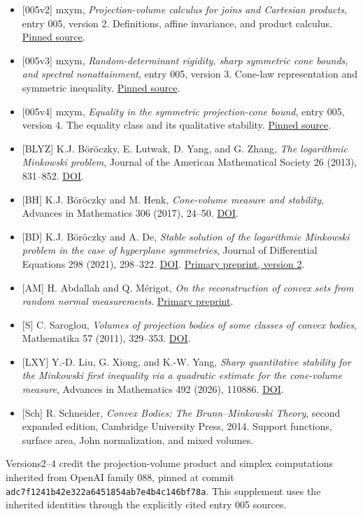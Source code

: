 \documentclass[
  11pt,
]{article}
\providecommand{\tightlist}{%
  \setlength{\itemsep}{0pt}\setlength{\parskip}{0pt}}
\begin{document}
\begin{itemize}
\tightlist
\item
  {[}005v2{]} mxym, \emph{Projection-volume calculus for joins and
  Cartesian products}, entry 005, version 2. Definitions, affine
  invariance, and product calculus.
  \href{https://github.com/mxym/math/blob/6785c1c830f8e19e2eb07b0bb89f4d475a8b154a/preprints/005-simplex-product-optimum/v2/paper.md}{Pinned
  source}.
\item
  {[}005v3{]} mxym, \emph{Random-determinant rigidity, sharp symmetric
  cone bounds, and spectral nonattainment}, entry 005, version 3.
  Cone-law representation and symmetric inequality.
  \href{https://github.com/mxym/math/blob/6785c1c830f8e19e2eb07b0bb89f4d475a8b154a/preprints/005-simplex-product-optimum/v3/paper.md}{Pinned
  source}.
\item
  {[}005v4{]} mxym, \emph{Equality in the symmetric projection-cone
  bound}, entry 005, version 4. The equality class and its qualitative
  stability.
  \href{https://github.com/mxym/math/blob/6785c1c830f8e19e2eb07b0bb89f4d475a8b154a/preprints/005-simplex-product-optimum/v4/paper.md}{Pinned
  source}.
\item
  {[}BLYZ{]} K.J. Böröczky, E. Lutwak, D. Yang, and G. Zhang, \emph{The
  logarithmic Minkowski problem}, Journal of the American Mathematical
  Society 26 (2013), 831--852.
  \href{https://doi.org/10.1090/S0894-0347-2012-00741-3}{DOI}.
\item
  {[}BH{]} K.J. Böröczky and M. Henk, \emph{Cone-volume measure and
  stability}, Advances in Mathematics 306 (2017), 24--50.
  \href{https://doi.org/10.1016/j.aim.2016.10.005}{DOI}.
\item
  {[}BD{]} K.J. Böröczky and A. De, \emph{Stable solution of the
  logarithmic Minkowski problem in the case of hyperplane symmetries},
  Journal of Differential Equations 298 (2021), 298--322.
  \href{https://doi.org/10.1016/j.jde.2021.07.002}{DOI}.
  \href{https://arxiv.org/html/2101.03395v2}{Primary preprint, version
  2}.
\item
  {[}AM{]} H. Abdallah and Q. Mérigot, \emph{On the reconstruction of
  convex sets from random normal measurements}.
  \href{https://arxiv.org/abs/1402.5010}{Primary preprint}.
\item
  {[}S{]} C. Saroglou, \emph{Volumes of projection bodies of some
  classes of convex bodies}, Mathematika 57 (2011), 329--353.
  \href{https://doi.org/10.1112/S0025579311001860}{DOI}.
\item
  {[}LXY{]} Y.-D. Liu, G. Xiong, and K.-W. Yang, \emph{Sharp
  quantitative stability for the Minkowski first inequality via a
  quadratic estimate for the cone-volume measure}, Advances in
  Mathematics 492 (2026), 110886.
  \href{https://doi.org/10.1016/j.aim.2026.110886}{DOI}.
\item
  {[}Sch{]} R. Schneider, \emph{Convex Bodies: The Brunn--Minkowski
  Theory}, second expanded edition, Cambridge University Press, 2014.
  Support functions, surface area, John normalization, and mixed
  volumes.
\end{itemize}

Versions2--4 credit the projection-volume product and simplex
computations inherited from OpenAI family 088, pinned at commit
\texttt{adc7f1241b42e322a6451854ab7e4b4c146bf78a}. This supplement uses
the inherited identities through the explicitly cited entry 005 sources.
\end{document}
